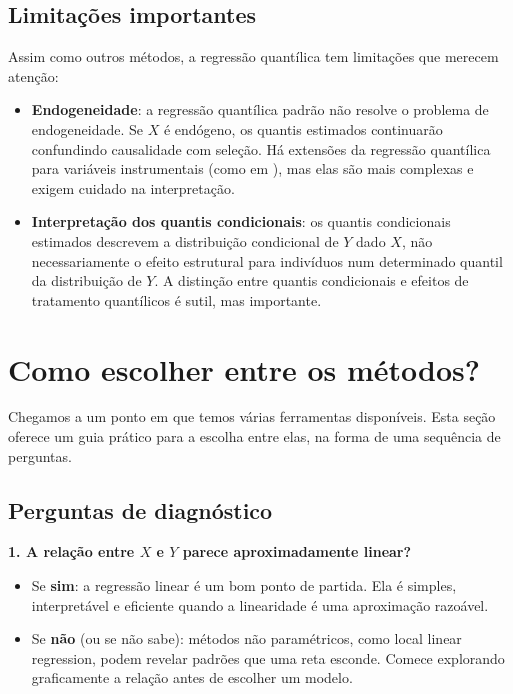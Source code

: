 \section*{Limitações importantes}

Assim como outros métodos, a regressão quantílica tem limitações que merecem atenção:

\begin{itemize}
  \item \textbf{Endogeneidade}: a regressão quantílica padrão não resolve o problema
  de endogeneidade. Se $X$ é endógeno, os quantis estimados continuarão confundindo
  causalidade com seleção. Há extensões da regressão quantílica para variáveis
  instrumentais (como em \citealt{chernozhukov_instrumental_2005}), mas elas são
  mais complexas e exigem cuidado na interpretação.
  \item \textbf{Interpretação dos quantis condicionais}: os quantis condicionais
  estimados descrevem a distribuição condicional de $Y$ dado $X$, não
  necessariamente o efeito estrutural para indivíduos num determinado quantil da
  distribuição de $Y$. A distinção entre quantis condicionais e efeitos de tratamento
  quantílicos é sutil, mas importante.
\end{itemize}

\chapter{Como escolher entre os métodos?}

Chegamos a um ponto em que temos várias ferramentas disponíveis. Esta seção oferece
um guia prático para a escolha entre elas, na forma de uma sequência de perguntas.

\section*{Perguntas de diagnóstico}

\textbf{1. A relação entre $X$ e $Y$ parece aproximadamente linear?}

\begin{itemize}
  \item Se \textbf{sim}: a regressão linear é um bom ponto de partida. Ela é simples,
  interpretável e eficiente quando a linearidade é uma aproximação razoável.
  \item Se \textbf{não} (ou se não sabe): métodos não paramétricos, como local linear
  regression, podem revelar padrões que uma reta esconde. Comece explorando
  graficamente a relação antes de escolher um modelo.
\end{itemize}

